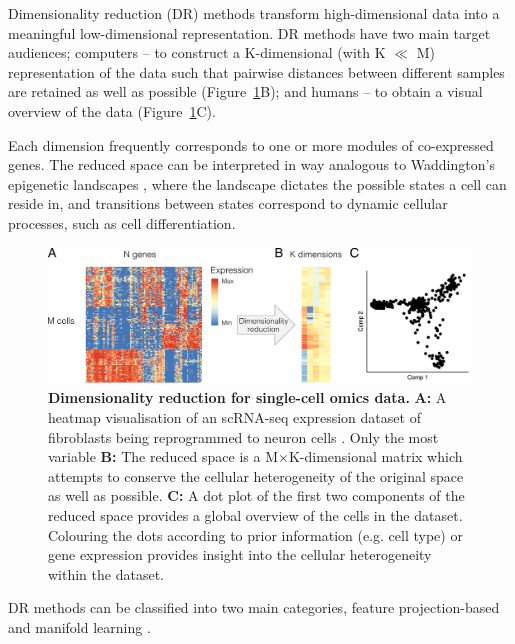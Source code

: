 Dimensionality reduction (DR) methods transform high-dimensional data into a meaningful low-dimensional representation. DR methods have two main target audiences; computers -- to construct a K-dimensional (with K $\ll$ M) representation of the data such that pairwise distances between different samples are retained as well as possible (Figure~\ref{fig:comp_tools_dimred}B); and humans -- to obtain a visual overview of the data (Figure~\ref{fig:comp_tools_dimred}C).

Each dimension frequently corresponds to one or more modules of co-expressed genes.  The reduced space can be interpreted in way analogous to Waddington’s epigenetic landscapes \cite{waddington_strategygenesdiscussion_1957,ferrell_bistabilitybifurcationswaddington_2012,rebhahn_animatedlandscaperepresentation_2014}, where the landscape dictates the possible states a cell can reside in, and transitions between states correspond to dynamic cellular processes, such as cell differentiation. 

\begin{figure}[htb!]
	\centering
	\includegraphics[width=\linewidth]{fig/comptools2/comptool_1_dimred.pdf} 
	\caption{
		\textbf{Dimensionality reduction for single-cell omics data.}
		\textbf{A:} A heatmap visualisation of an scRNA-seq expression dataset of fibroblasts being reprogrammed to neuron cells \cite{treutlein_dissectingdirectreprogramming_2016}. Only the most variable 
		\textbf{B:} The reduced space is a M$\times$K-dimensional matrix which attempts to conserve the cellular heterogeneity of the original space as well as possible.
		\textbf{C:} A dot plot of the first two components of the reduced space provides a global overview of the cells in the dataset. Colouring the dots according to prior information (e.g. cell type) or gene expression provides insight into the cellular heterogeneity within the dataset.
	}
	\label{fig:comp_tools_dimred}
\end{figure}

DR methods can be classified into two main categories, feature projection-based and manifold learning \cite{engel_surveydimensionreduction_2012}. 

